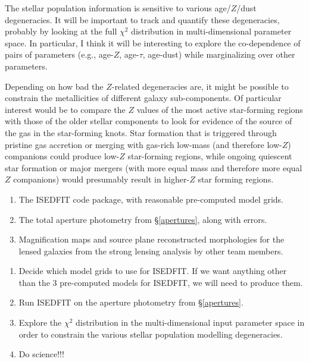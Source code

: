 \documentclass{emulateapj}
\begin{document}
The stellar population information is sensitive to various
age/$Z$/dust degeneracies.  It will be important to track and quantify
these degeneracies, probably by looking at the full $\chi^2$
distribution in multi-dimensional parameter space.  In particular, I
think it will be interesting to explore the co-dependence of pairs of
parameters (e.g., age-$Z$, age-$\tau$, age-dust) while marginalizing
over other parameters.  

Depending on how bad the $Z$-related degeneracies are, it might be
possible to constrain the metallicities of different galaxy
sub-components.  Of particular interest would be to compare the $Z$
values of the most active star-forming regions with those of the older
stellar components to look for evidence of the source of the gas in
the star-forming knots.  Star formation that is triggered through
pristine gas accretion or merging with gas-rich low-mass (and
therefore low-$Z$) companions could produce low-$Z$ star-forming
regions, while ongoing quiescent star formation or major mergers (with
more equal mass and therefore more equal $Z$ companions) would
presumably result in higher-$Z$ star forming regions.  

\vspace{0.08in}
\vspace{-0.1in}
\begin{enumerate}\itemsep-6pt
\item {The ISEDFIT code package, with reasonable pre-computed model
  grids.}
\item {The total aperture photometry from \S\ref{apertures}, along
  with errors.}
\item {Magnification maps and source plane reconstructed morphologies
  for the lensed galaxies from the strong lensing analysis by other
  team members.}
\end{enumerate}

\vspace{-0.1in}
\begin{enumerate}\itemsep-6pt
\item {Decide which model grids to use for ISEDFIT.  If we want
  anything other than the 3 pre-computed models for ISEDFIT, we will
  need to produce them.}
\item {Run ISEDFIT on the aperture photometry from \S\ref{apertures}.}
\item {Explore the $\chi^2$ distribution in the multi-dimensional
  input parameter space in order to constrain the various stellar
  population modelling degeneracies.}
\item {Do science!!!}
\end{enumerate}
\end{document}
